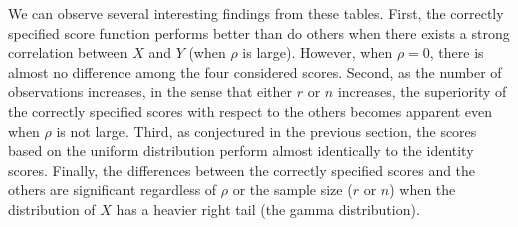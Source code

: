 \documentclass[12pt]{article}
\begin{document}
We can observe several interesting findings from these tables.
First, the correctly specified score
function performs better than do others when there exists a strong correlation between $X$ and $Y$ (when 
$\rho$ is large). However, when $\rho=0$, there is almost no difference among the four considered 
scores. Second, as the number of observations increases, in the sense that either $r$ or $n$ increases, 
the superiority of the correctly specified scores with respect to the others becomes apparent even when $\rho$ is not large. 
Third, as conjectured in the previous section, the scores based on the uniform distribution 
perform almost identically to the identity scores. Finally, the
differences between the correctly specified scores and the others are
significant regardless of $\rho$ or the sample size ($r$ or $n$) 
when the distribution of $X$ has a heavier right tail (the gamma distribution).  
\end{document}
